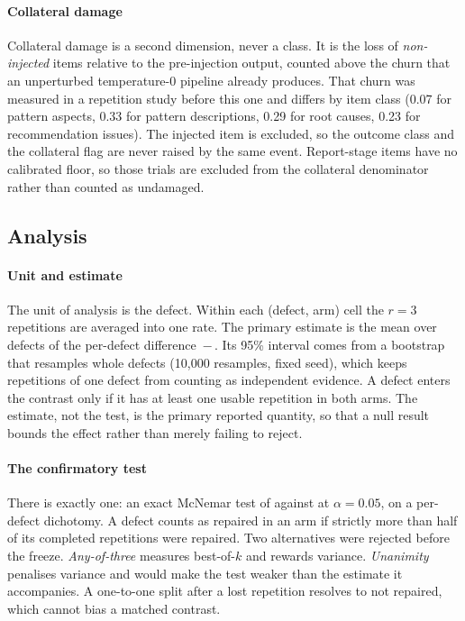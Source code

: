 \paragraph{Collateral damage}
Collateral damage is a second dimension, never a class. It is the loss of
\emph{non-injected} items relative to the pre-injection output, counted above
the churn that an unperturbed temperature-0 pipeline already produces. That
churn was measured in a repetition study before this one and differs by item
class (0.07 for pattern aspects, 0.33 for pattern descriptions, 0.29 for root
causes, 0.23 for recommendation issues). The injected item is excluded, so the
outcome class and the collateral flag are never raised by the same event.
Report-stage items have no calibrated floor, so those trials are excluded from
the collateral denominator rather than counted as undamaged.

\subsection{Analysis}
\label{sec:design-analysis}

\paragraph{Unit and estimate}
The unit of analysis is the defect. Within each (defect, arm) cell the $r=3$
repetitions are averaged into one rate. The primary estimate is the mean over
defects of the per-defect difference \,$-$\,. Its 95\%
interval comes from a bootstrap that resamples whole defects (10{,}000
resamples, fixed seed), which keeps repetitions of one defect from counting as
independent evidence. A defect enters the contrast only if it has at least one
usable repetition in both arms. The estimate, not the test, is the primary
reported quantity, so that a null result bounds the effect rather than merely
failing to reject.

\paragraph{The confirmatory test}
There is exactly one: an exact McNemar test of  against  at
$\alpha=0.05$, on a per-defect dichotomy. A defect counts as repaired in an arm
if strictly more than half of its completed repetitions were repaired. Two
alternatives were rejected before the freeze. \emph{Any-of-three} measures
best-of-$k$ and rewards variance. \emph{Unanimity} penalises variance and would
make the test weaker than the estimate it accompanies. A one-to-one split
after a lost repetition resolves to not repaired, which cannot bias a matched
contrast.

